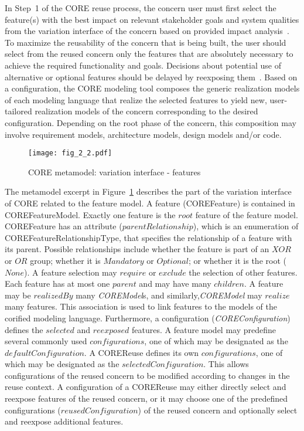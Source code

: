 In Step~1 of the CORE reuse process, the concern user must first select the feature(s) with the best impact on relevant stakeholder goals and system qualities from the variation interface of the concern based on provided impact analysis~\cite{duran2016investigation}. To maximize the reusability of the concern that is being built, the user should select from the reused concern only the features that are absolutely necessary to achieve the required functionality and goals. Decisions about potential use of alternative or optional features should be delayed by reexposing them~\cite{kienzle2016delaying}. Based on a configuration, the CORE modeling tool composes the generic realization models of each modeling language that realize the selected features to yield new, user-tailored realization models of the concern corresponding to the desired configuration. Depending on the root phase of the concern, this composition may involve requirement models, architecture models, design models and/or code.

\begin{figure}
	\centering
	\texttt{[image: fig\_2\_2.pdf]}
	\caption{CORE metamodel: variation interface - features}
	\label{fig:2.2}
\end{figure}

The metamodel excerpt in Figure~\ref{fig:2.2} describes the part of the variation interface of CORE related to the feature model. A feature ({\cls COREFeature}) is contained in {\cls COREFeatureModel}. Exactly one feature is the $root$ feature of the feature model. {\cls COREFeature} has an attribute ($parentRelationship$), which is an enumeration of {\cls COREFeatureRelationshipType}, that specifies the relationship of a feature with its parent. Possible relationships include whether the feature is part of an $XOR$ or $OR$ group; whether it is $Mandatory$ or $Optional$; or whether it is the root ($None$). A feature selection may $require$ or $exclude$ the selection of other features. Each feature has at most one $parent$ and may have many $children$. A feature may be $realizedBy$ many \textit{\cls COREModel}s, and similarly,\textit{\cls COREModel} may $realize$ many features. This association is used to link features to the models of the corified modeling language. Furthermore, a configuration (\textit{\cls COREConfiguration}) defines the $selected$ and $reexposed$ features. A feature model may predefine several commonly used $configurations$, one of which may be designated as the $defaultConfiguration$. A {\cls COREReuse} defines its own $configurations$, one of which may be designated as the $selectedConfiguration$. This allows configurations of the reused concern to be modified according to changes in the reuse context. A configuration of a {\cls COREReuse} may either directly select and reexpose features of the reused concern, or it may choose one of the predefined configurations ($reusedConfiguration$) of the reused concern and optionally select and reexpose additional features.


